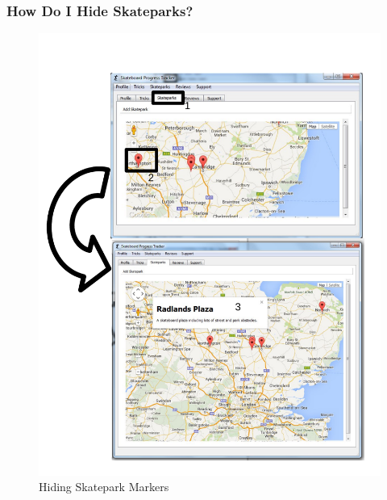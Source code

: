 \subsubsection{How Do I Hide Skateparks?}  \label{HideSkatepark}

\begin{figure}[H]
    \includegraphics[width=\textwidth]{./Manual/Images/HideSkatepark.pdf}
    \caption{Hiding Skatepark Markers} \label{fig:Hide Skatepark}
\end{figure}

